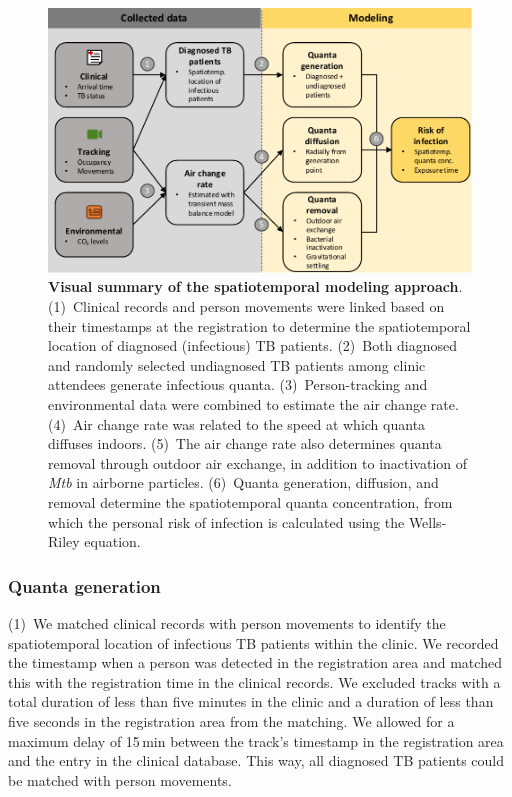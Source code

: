 \documentclass[fleqn,11pt]{wlscirep}
\begin{document}
\begin{figure}[!htpb]
    \centering
    \includegraphics{doc/model-flow-chart.pdf}
    \caption{\textbf{Visual summary of the spatiotemporal modeling approach}. (1)~Clinical records and person movements were linked based on their timestamps at the registration to determine the spatiotemporal location of diagnosed (infectious) TB patients. (2)~Both diagnosed and randomly selected undiagnosed TB patients among clinic attendees generate infectious quanta. (3)~Person-tracking and environmental data were combined to estimate the air change rate. (4)~Air change rate was related to the speed at which quanta diffuses indoors. (5)~The air change rate also determines quanta removal through outdoor air exchange, in addition to inactivation of \emph{Mtb} in airborne particles. (6)~Quanta generation, diffusion, and removal determine the spatiotemporal quanta concentration, from which the personal risk of infection is calculated using the Wells-Riley equation.}
    \label{fig:modeling-flow}
\end{figure}

\subsubsection*{Quanta generation}

(1)~We matched clinical records with person movements to identify the spatiotemporal location of infectious TB patients within the clinic. We recorded the timestamp when a person was detected in the registration area and matched this with the registration time in the clinical records. We excluded tracks with a total duration of less than five minutes in the clinic and a duration of less than five seconds in the registration area from the matching. We allowed for a maximum delay of 15\,min between the track's timestamp in the registration area and the entry in the clinical database. This way, all diagnosed TB patients could be matched with person movements. 
\end{document}
